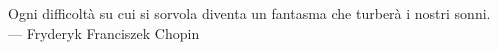 
\cleardoublepage
{}
\thispagestyle{empty}

\vspace*{3cm}

\begin{center}
Ogni difficoltà su cui si sorvola diventa un fantasma che turberà i nostri sonni. \\ \medskip
--- Fryderyk Franciszek Chopin    
\end{center}

\medskip
